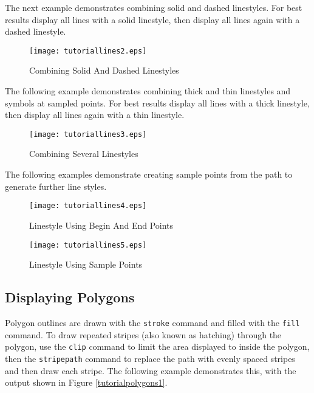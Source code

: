 The next example demonstrates
combining solid and dashed linestyles.
For best results display all lines with a solid linestyle,
then display all lines again with a dashed linestyle.



\begin{figure}[htb]
\texttt{[image: tutoriallines2.eps]}
\caption{Combining Solid And Dashed Linestyles}
\label{tutoriallines2}
\end{figure}

The following example demonstrates combining thick and
thin linestyles and symbols at sampled points.
For best results display all lines with a thick linestyle,
then display all lines again with a thin linestyle.



\begin{figure}[htb]
\texttt{[image: tutoriallines3.eps]}
\caption{Combining Several Linestyles}
\label{tutoriallines3}
\end{figure}

The following examples demonstrate creating sample points
from the path to generate further line styles.



\begin{figure}[htb]
\texttt{[image: tutoriallines4.eps]}
\caption{Linestyle Using Begin And End Points}
\label{tutoriallines4}
\end{figure}



\begin{figure}[htb]
\texttt{[image: tutoriallines5.eps]}
\caption{Linestyle Using Sample Points}
\label{tutoriallines5}
\end{figure}

\subsection{Displaying Polygons}

Polygon outlines are drawn with the \texttt{stroke}
command and filled with the \texttt{fill} command.
To draw repeated stripes (also known as hatching) through
the polygon, use the \texttt{clip}
command to limit the area displayed to inside the polygon,
then the \texttt{stripepath}
command to replace the path with evenly spaced stripes and
then draw each stripe.  The following example demonstrates this,
with the output shown in Figure \ref{tutorialpolygons1}.

